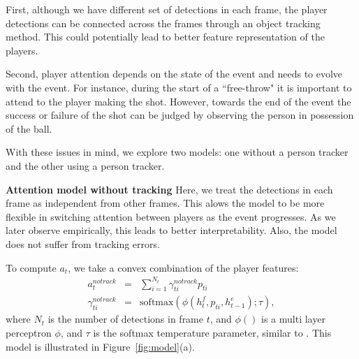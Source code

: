 First, although we have different set of detections in each frame, the player
detections can be connected across the frames through an object tracking
method. This could potentially lead to better feature representation of the
players.

Second, player attention depends on the state of the event and needs to evolve
with the event.  For instance, during the start of a ``free-throw" it is
important to attend to the player making the shot. However, towards the end of
the event the success or failure of the shot can be judged by observing the
person in possession of the ball.

With these issues in mind, we explore two models:
one without a person  tracker and the other using a person tracker.


\noindent \textbf{Attention model without tracking}
Here, we treat the detections in each frame as independent from other
frames.  This alows the model to be more flexible in switching attention
between players as the event progresses.  As we later observe empirically, this
leads to better interpretability.  Also, the model does not suffer from
tracking errors.

To compute $a_t$, we take a convex combination of the player features:
\begin{eqnarray} 
\label{eq:notrack}
  a_t^{notrack} & = & \sum_{i=1}^{N_t} \gamma_{ti}^{notrack} p_{ti} 
\\ \nonumber
  \gamma_{ti}^{notrack} & = & \text{softmax} \left(\phi\left(h^f_t, p_{ti}, h^e_{t-1}\right); \tau\right),
\end{eqnarray}
where $N_t$ is the number of detections in frame $t$,
and $\phi()$ is a 
multi layer perceptron $\phi$, 
and $\tau$ is the softmax temperature parameter,
similar to
\cite{Bahdnau_arxiv14}. 
This model is illustrated in Figure~\ref{fig:model}(a).


